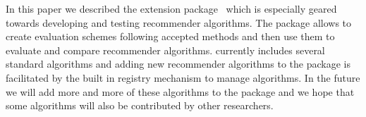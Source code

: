 \documentclass[nojss]{jss}
\begin{document}

%
In this paper we described the 
extension package~
which is especially geared towards developing and testing
recommender algorithms.
The package allows to create evaluation schemes following accepted
methods and then use them to evaluate and compare recommender algorithms.
 currently includes several standard algorithms and
adding new recommender algorithms to the package is facilitated by the
built in registry mechanism to manage algorithms.
%
In the future we will add more and more of these algorithms to the package and
we hope that some algorithms will also
be contributed by other researchers.




\end{document}
